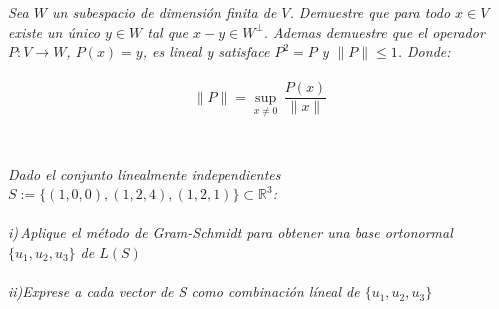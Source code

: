 \documentclass[11pt,letterpaper]{article}
\newcommand{\R}{\mathbb{R}}
\begin{document}
\begin{tcolorbox}[
	title = \textcolor{black}{\textcolor{white}{Problema 9}},]
\textit{Sea $W$ un subespacio de dimensi\'on finita de $V$. Demuestre que para todo $x\in V$ existe un \'unico $y\in W$ tal que $x-y\in W^{\bot}$. Ademas demuestre 
que el operador $P:V\rightarrow W$, $P(x)=y$, es lineal y satisface $P^2=P$ y $\|P\|\leq 1$. Donde:\,\\
\,\\
\begin{equation*}
	\|P\|=\sup_{x\neq 0}\,\frac{P(x)}{\|x\|} 
\end{equation*} 
}
\end{tcolorbox}\,\\
\begin{tcolorbox}[
	title = \textcolor{black}{\textcolor{white}{Problema 10}},]
\textit{Dado el conjunto linealmente independientes $S:=\{(1,0,0),(1,2,4),(1,2,1)\}\subset \R^3$:\,\\
\,\\
i)\,Aplique el m\'etodo de Gram-Schmidt para obtener una base ortonormal $\{u_1,u_2,u_3\}$ de $L(S)$\,\\
\,\\
ii)Exprese a cada vector de S como combinaci\'on l\'ineal de $\{u_1,u_2,u_3\}$
}
\end{tcolorbox}\,\\
\end{document}
